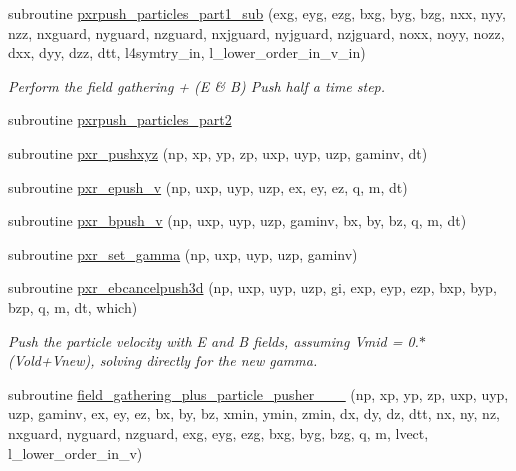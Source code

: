 \begin{DoxyCompactItemize}
subroutine \hyperlink{particles__push_8_f90_af540a0f57e31e83e106a01e492318462}{pxrpush\+\_\+particles\+\_\+part1\+\_\+sub} (exg, eyg, ezg, bxg, byg, bzg, nxx, nyy, nzz, nxguard, nyguard, nzguard, nxjguard, nyjguard, nzjguard, noxx, noyy, nozz, dxx, dyy, dzz, dtt, l4symtry\+\_\+in, l\+\_\+lower\+\_\+order\+\_\+in\+\_\+v\+\_\+in)
\begin{DoxyCompactList}\small\item\em Perform the field gathering + (E \& B) Push half a time step. \end{DoxyCompactList}\item 
subroutine \hyperlink{particles__push_8_f90_ab65aba49863198b09c221d6bf6a8f6bc}{pxrpush\+\_\+particles\+\_\+part2}
\item 
subroutine \hyperlink{particles__push_8_f90_aa77ade6c16b80186ff4ba5e899c70848}{pxr\+\_\+pushxyz} (np, xp, yp, zp, uxp, uyp, uzp, gaminv, dt)
\item 
subroutine \hyperlink{particles__push_8_f90_ad3b68e848193f6e2e6adb95490c79ea3}{pxr\+\_\+epush\+\_\+v} (np, uxp, uyp, uzp, ex, ey, ez, q, m, dt)
\item 
subroutine \hyperlink{particles__push_8_f90_a7ea5e15ca81ac196298e046dec12e3b9}{pxr\+\_\+bpush\+\_\+v} (np, uxp, uyp, uzp, gaminv, bx, by, bz, q, m, dt)
\item 
subroutine \hyperlink{particles__push_8_f90_ad4471b8d19a27dc1e15683c68c2452d2}{pxr\+\_\+set\+\_\+gamma} (np, uxp, uyp, uzp, gaminv)
\item 
subroutine \hyperlink{particles__push_8_f90_a4a0f739cde5e2d34dca78023a8b7145f}{pxr\+\_\+ebcancelpush3d} (np, uxp, uyp, uzp, gi, exp, eyp, ezp, bxp, byp, bzp, q, m, dt, which)
\begin{DoxyCompactList}\small\item\em Push the particle velocity with E and B fields, assuming Vmid = 0.$\ast$(Vold+\+Vnew), solving directly for the new gamma. \end{DoxyCompactList}\item 
subroutine \hyperlink{particles__push_8_f90_af9cba768132f6e7e5d6a39108c2c4118}{field\+\_\+gathering\+\_\+plus\+\_\+particle\+\_\+pusher\+\_\+\_\+\_} (np, xp, yp, zp, uxp, uyp, uzp, gaminv,                                                                                                                                                   ex, ey, ez, bx, by, bz, xmin, ymin, zmin,                                                                                                                                                           dx, dy, dz, dtt, nx, ny, nz, nxguard, nyguard, nzguard,                                                                                                                                                   exg, eyg, ezg, bxg, byg, bzg, q, m, lvect, l\+\_\+lower\+\_\+order\+\_\+in\+\_\+v)

\end{DoxyCompactItemize}

